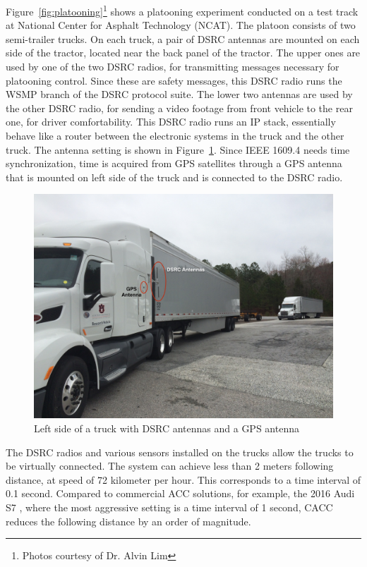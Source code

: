 \documentclass[12pt]{report}
\begin{document}
Figure~\ref{fig:platooning}\footnote{Photos courtesy of Dr. Alvin Lim} shows a platooning experiment conducted on a test track at National Center for Asphalt Technology (NCAT). The platoon consists of two semi-trailer trucks. On each truck, a pair of DSRC antennas are mounted on each side of the tractor, located near the back panel of the tractor. The upper ones are used by one of the two DSRC radios, for transmitting messages necessary for platooning control. Since these are safety messages, this DSRC radio runs the WSMP branch of the DSRC protocol suite. The lower two antennas are used by the other DSRC radio, for sending a video footage from front vehicle to the rear one, for driver comfortability. This DSRC radio runs an IP stack, essentially behave like a router between the electronic systems in the truck and the other truck. The antenna setting is shown in Figure~\ref{fig:dsrc_test_trucks}. Since IEEE 1609.4 needs time synchronization, time is acquired from GPS satellites through a GPS antenna that is mounted on left side of the truck and is connected to the DSRC radio.

\begin{figure}[h]
  \begin{center}
    \includegraphics[width=.6\textwidth]{figures/dsrc-test-trucks.jpg}
    \caption{\label{fig:dsrc_test_trucks}Left side of a truck with DSRC antennas and a GPS antenna}
  \end{center}
\end{figure}

The DSRC radios and various sensors installed on the trucks allow the trucks to be virtually connected. The system can achieve less than 2 meters following distance, at speed of 72 kilometer per hour. This corresponds to a time interval of 0.1 second. Compared to commercial ACC solutions, for example, the 2016 Audi S7 \cite{audi}, where the most aggressive setting is a time interval of 1 second, CACC reduces the following distance by an order of magnitude.
\end{document}
